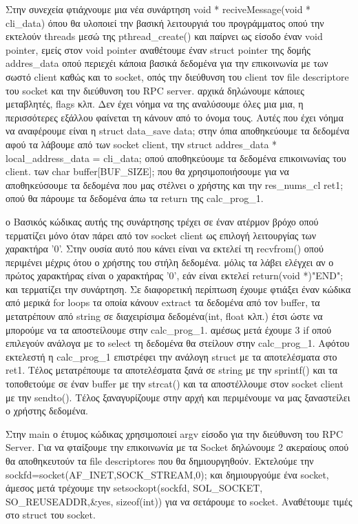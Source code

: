 \noindent
Στην συνεχεία φτιάχνουμε μια νέα συνάρτηση void * reciveMessage(void * cli\_data) όπου θα υλοποιεί την βασική
λειτουργιά του προγράμματος οπού την εκτελούν threads μεσώ της pthread\_create() και παίρνει ως είσοδο έναν void
pointer, εμείς στον void pointer αναθέτουμε έναν struct pointer της δομής addres\_data οπού περιεχέι κάποια
βασικά δεδομένα για την επικοινωνία με των σωστό client καθώς και το socket, οπός την διεύθυνση του client 
τον file descriptore του socket και την διεύθυνση του RPC server. αρχικά δηλώνουμε κάποιες μεταβλητές, flags κλπ.
Δεν έχει νόημα να της αναλύσουμε όλες μια μια, η περισσότερες εξάλλου φαίνεται τη κάνουν από το όνομα τους. Αυτές που έχει νόημα να αναφέρουμε είναι η struct data\_save data; στην όπια αποθηκεύουμε τα δεδομένα αφού τα λάβουμε
από των socket client, την struct addres\_data * local\_address\_data = cli\_data; οπού αποθηκεύουμε τα δεδομένα
επικοινωνίας του client. των char buffer[BUF\_SIZE]; που θα χρησιμοποιήσουμε για να αποθηκεύσουμε τα δεδομένα
που μας στέλνει ο χρήστης και την res\_nums\_cl ret1; οπού θα πάρουμε τα δεδομένα άπω τα return της calc\_prog\_1.

\noindent
ο Βασικός κώδικας αυτής της συνάρτησης τρέχει σε έναν ατέρμον βρόχο οπού τερματίζει μόνο όταν πάρει από τον socket
client ως επιλογή λειτουργίας των χαρακτήρα '0'. Στην ουσία αυτό που κάνει είναι να εκτελεί τη recvfrom() οπού
περιμένει μέχρις ότου ο χρήστης του στήλη δεδομένα. μόλις τα λάβει ελέγχει αν ο πρώτος χαρακτήρας είναι ο 
χαρακτήρας '0', εάν είναι εκτελεί return(void *)"END"; και τερματίζει την συνάρτηση. Σε διαφορετική περίπτωση 
έχουμε φτιάξει έναν κώδικα από μερικά for loops τα οποία κάνουν extract τα δεδομένα από τον buffer, τα 
μετατρέπουν από string σε διαχειρίσιμα δεδομένα(int, float κλπ.) έτσι ώστε να μπορούμε να τα αποστείλουμε στην 
calc\_prog\_1. αμέσως μετά έχουμε 3 if οπού επιλεγούν ανάλογα με το select τη δεδομένα θα στείλουν στην calc\_prog\_1. Αφότου εκτελεστή η calc\_prog\_1 επιστρέφει την ανάλογη struct με τα αποτελέσματα στο ret1. Τέλος 
μετατρέπουμε τα αποτελέσματα ξανά σε string με την sprintf() και τα τοποθετούμε σε έναν buffer με την strcat()
και τα αποστέλλουμε στον socket client με την sendto(). Τέλος ξαναγυρίζουμε στην αρχή και περιμένουμε να μας
ξαναστείλει ο χρήστης δεδομένα.

\noindent
Στην main ο έτυμος κώδικας χρησιμοποιεί argv είσοδο για την διεύθυνση του RPC Server. Για να φταίξουμε την 
επικοινωνία με τα Socket δηλώνουμε 2 ακεραίους οπού θα αποθηκευτούν τα file descriptores που θα δημιουργηθούν.
Εκτελούμε την sockfd=socket(AF\_INET,SOCK\_STREAM,0); και δημιουργούμε ένα socket, άμεσος μετά τρέχουμε την
setsockopt(sockfd, SOL\_SOCKET, SO\_REUSEADDR,\&yes, sizeof(int)) για να σετάρουμε το socket. Αναθέτουμε τιμές 
στο struct του socket.

